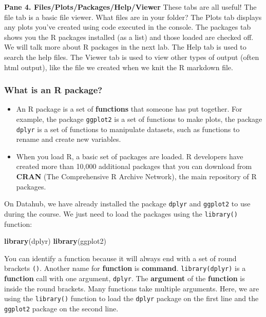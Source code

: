 \documentclass[
]{article}
\newenvironment{Shaded}{\begin{snugshade}}{\end{snugshade}}
\newcommand{\FunctionTok}[1]{\textcolor[rgb]{0.13,0.29,0.53}{\textbf{#1}}}
\newcommand{\NormalTok}[1]{#1}
\providecommand{\tightlist}{%
  \setlength{\itemsep}{0pt}\setlength{\parskip}{0pt}}
\begin{document}
\setlength{\leftskip}{0pt}

\textbf{Pane 4. Files/Plots/Packages/Help/Viewer} These tabs are all
useful! The file tab is a basic file viewer. What files are in your
folder? The Plots tab displays any plots you've created using code
executed in the console. The packages tab shows you the R packages
installed (as a list) and those loaded are checked off. We will talk
more about R packages in the next lab. The Help tab is used to search
the help files. The Viewer tab is used to view other types of output
(often html output), like the file we created when we knit the R
markdown file.

\subsubsection{What is an R package?}\label{what-is-an-r-package}

\begin{itemize}
\tightlist
\item
  An R package is a set of \textbf{functions} that someone has put
  together. For example, the package \texttt{ggplot2} is a set of
  functions to make plots, the package \texttt{dplyr} is a set of
  functions to manipulate datasets, such as functions to rename and
  create new variables.
\item
  When you load R, a basic set of packages are loaded. R developers have
  created more than 10,000 additional packages that you can download
  from \textbf{CRAN} (The Comprehensive R Archive Network), the main
  repository of R packages.
\end{itemize}

On Datahub, we have already installed the package \texttt{dplyr} and
\texttt{ggplot2} to use during the course. We just need to load the
packages using the \texttt{library()} function:

\begin{Shaded}
\begin{Highlighting}[]
\FunctionTok{library}\NormalTok{(dplyr)}
\FunctionTok{library}\NormalTok{(ggplot2)}
\end{Highlighting}
\end{Shaded}

You can identify a function because it will always end with a set of
round brackets \texttt{()}. Another name for \textbf{function} is
\textbf{command}. \texttt{library(dplyr)} is a \textbf{function} call
with one argument, \texttt{dplyr}. The \textbf{argument} of the
\textbf{function} is inside the round brackets. Many functions take
multiple arguments. Here, we are using the \texttt{library()} function
to load the \texttt{dplyr} package on the first line and the
\texttt{ggplot2} package on the second line.
\end{document}
